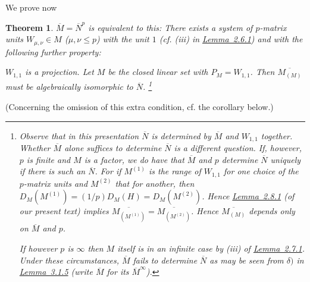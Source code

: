 \documentclass[b5paper,twoside]{article}
\newcommand{\lemref}[2]{\hyperref[#1]{\mbox{Lemma~#2}}}
\theoremstyle{mvnplain}
\newtheorem{theorem}{Theorem}
\newcommand{\M}{\mathbf M}
\newcommand{\N}{\mathbf N}
\newcommand{\Hilbert}{\mathfrak H}
\def\M{M}%
\def\N{N}%
\def\Hilbert{H}%
\def\mathfrak#1{#1}%
\begin{document}
We prove now
\begin{theorem}\label{thm:V}
$\overline{\M}=\overline{\N}^{p}$ is equivalent to this: There exists a
system of $p$-matrix units $W_{\mu,\nu}\in\M$ ($\mu,\nu\leq p$) with the
unit $1$ (cf. (iii) in \lemref{lem:2.6.1}{2.6.1}) and with the following
further property:

$W_{1,1}$ is a projection.  Let $\mathfrak M$ be the closed linear set with
$P_{\mathfrak M}=W_{1,1}$.  Then $\overline{\M_{(\mathfrak M)}}$ must be
algebraically isomorphic to $\overline{\N}$.
\footnote{Observe that in this presentation $\overline{\N}$ is determined
by $\overline{\M}$ and $W_{1,1}$ together.  Whether $\overline{\M}$ alone
suffices to determine $\overline{\N}$ is a different question.  If, however,
$p$ is finite and $\M$ is a factor, we do have that $\overline{\M}$ and $p$
determine $\overline{\N}$ uniquely if there is such an $\overline{\N}$.
For if $\mathfrak M^{(1)}$ is the range of $W_{1,1}$ for one choice of the
$p$-matrix units and $\mathfrak M^{(2)}$ that for another, then
$D_{\M}(\mathfrak M^{(1)})=(1/p)D_{\M}(\Hilbert)
=D_{\M}(\mathfrak M^{(2)})$.  Hence \lemref{lem:2.8.1}{2.8.1} (of our
present text) implies
$\overline{\M_{(\mathfrak M^{(1)})}}
=\overline{\M_{(\mathfrak M^{(2)})}}$.  Hence
$\overline{\M_{(\mathfrak M)}}$ depends only on $\overline{\M}$ and $p$.

If however $p$ is $\infty$ then $\M$ itself is in an infinite case by (iii)
of \lemref{lem:2.7.1}{2.7.1}.  Under these circumstances,
$\overline{\M}$ fails to determine $\overline{\N}$ as may be seen from
$\delta)$ in \lemref{lem:3.1.5}{3.1.5} (write $\overline{\M}$ for its
$\overline{\M}^{\infty}$).}
\end{theorem}
(Concerning the omission of this extra condition, cf. the corollary below.)
\end{document}
